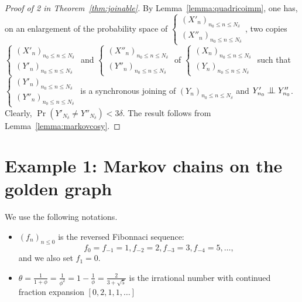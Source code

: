 \documentclass[12pt,a4paper]{article}
\begin{document}
\begin{proof}[Proof of 2 in Theorem~\ref{thm:joinable}]
By Lemma~\ref{lemma:quadricoimm}, 
one has, on an enlargement of the probability space of 
$\left\{\begin{smallmatrix} {(X'_n)}_{n_0 \leq n \leq N_\delta} \\ 
{(X''_n)}_{n_0 \leq n \leq N_\delta}
\end{smallmatrix}\right.$, two copies 
$\left\{\begin{smallmatrix} {(X'_n)}_{n_0 \leq n \leq N_\delta} \\ 
{(Y'_n)}_{n_0 \leq n \leq N_\delta}
\end{smallmatrix}\right.$ and 
$\left\{\begin{smallmatrix} {(X''_n)}_{n_0 \leq n \leq N_\delta} \\ 
{(Y''_n)}_{n_0 \leq n \leq N_\delta}
\end{smallmatrix}\right.$
of 
$\left\{\begin{smallmatrix} {(X_n)}_{n_0 \leq n \leq N_\delta} \\ 
{(Y_n)}_{n_0 \leq n \leq N_\delta}
\end{smallmatrix}\right.$ 
such that 
$\left\{\begin{smallmatrix} {(Y'_n)}_{n_0 \leq n \leq N_\delta} \\ 
{(Y''_n)}_{n_0 \leq n \leq N_\delta}
\end{smallmatrix}\right.$ is a synchronous joining of 
${(Y_n)}_{n_0 \leq n \leq N_\delta}$ and 
$Y'_{n_0} \indep Y''_{n_0}$. 
Clearly,  $\Pr(Y'_{N_\delta} \neq Y''_{N_\delta}) < 3\delta$. 
The result follows from Lemma~\ref{lemma:markovcosy}.
\end{proof}


\section{Example 1: Markov chains on the golden graph} 

We use the following notations.

\begin{itemize}
\item  ${(f_n)}_{n \leq 0}$ is the reversed Fibonnaci sequence:
$$
f_0=f_{-1}=1, f_{-2}=2, f_{-3}=3, f_{-4}=5, \ldots,
$$
and we also set $f_1=0$. 

\item $\theta=\frac{1}{1+\phi}=\frac{1}{\phi^2}=1-\frac{1}{\phi}=\frac{2}{3+\sqrt{5}}$ is the irrational 
number with continued fraction expansion $[0,2,1,1,\ldots]$
\end{itemize}
\end{document}
